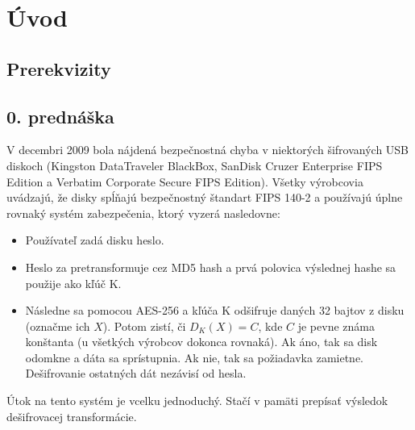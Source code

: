 \chapter{Úvod}\label{chapter:uvod}

\section{Prerekvizity}

\section{0. prednáška}

V decembri 2009 bola nájdená bezpečnostná chyba v niektorých šifrovaných USB diskoch
(Kingston DataTraveler BlackBox, SanDisk Cruzer Enterprise FIPS Edition a
Verbatim Corporate Secure FIPS Edition). Všetky výrobcovia uvádzajú, že disky
spĺňajú bezpečnostný štandart FIPS 140-2 a používajú úplne rovnaký systém zabezpečenia,
ktorý vyzerá nasledovne:
\begin{itemize}
\item Používateľ zadá disku heslo.
\item Heslo za pretransformuje cez MD5 hash a prvá polovica výslednej hashe sa použije ako kľúč K.
\item Následne sa pomocou AES-256 a kľúča K odšifruje daných 32 bajtov z disku (označme ich $X$). Potom zistí, či
$D_K(X)=C$, kde $C$ je pevne známa konštanta (u všetkých výrobcov dokonca rovnaká). Ak áno, tak sa disk odomkne a dáta sa sprístupnia.
Ak nie, tak sa požiadavka zamietne. Dešifrovanie ostatných dát nezávisí od hesla.
\end{itemize}

Útok na tento systém je vcelku jednoduchý. Stačí v pamäti prepísať výsledok dešifrovacej transformácie. 



